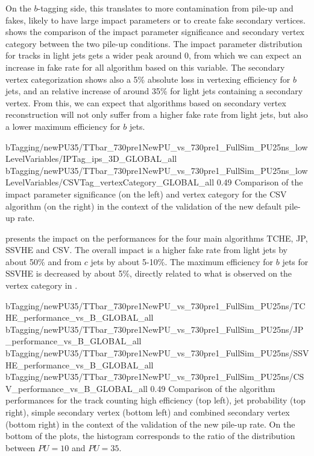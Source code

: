     On the $b$-tagging side, this translates to more contamination from pile-up and
    fakes, likely to have large impact parameters or to create fake secondary vertices.
     shows the comparison of the impact
    parameter significance and secondary vertex category between the two pile-up conditions.
    The impact parameter distribution for tracks in light jets gets a wider peak around
    0, from which we can expect an increase in fake rate for all algorithm based on
    this variable. The secondary vertex categorization shows also a 5\% absolute loss
    in vertexing efficiency for $b$ jets, and an relative increase of around 35\% for light
    jets containing a secondary vertex. From this, we can expect that algorithms based
    on secondary vertex reconstruction will not only suffer from a higher fake rate from
    light jets, but also a lower maximum efficiency for $b$ jets.

                     {bTagging/newPU35/TTbar_730pre1NewPU_vs_730pre1_FullSim_PU25ns_lowLevelVariables/IPTag_ips_3D_GLOBAL_all}
                     {bTagging/newPU35/TTbar_730pre1NewPU_vs_730pre1_FullSim_PU25ns_lowLevelVariables/CSVTag_vertexCategory_GLOBAL_all}
                     {0.49}
                     {Comparison of the impact parameter significance (on the left)
                     and vertex category for the CSV algorithm (on the right) in the
                     context of the validation of the new default pile-up rate.}

     presents the impact on the performances
    for the four main algorithms TCHE, JP, SSVHE and CSV. The overall impact is a higher
    fake rate from light jets by about 50\% and from $c$ jets by about 5-10\%. The
    maximum efficiency for $b$ jets for SSVHE is decreased by about 5\%, directly
    related to what is observed on the vertex category in .

                      {bTagging/newPU35/TTbar_730pre1NewPU_vs_730pre1_FullSim_PU25ns/TCHE_performance_vs_B_GLOBAL_all}
                      {bTagging/newPU35/TTbar_730pre1NewPU_vs_730pre1_FullSim_PU25ns/JP_performance_vs_B_GLOBAL_all}
                      {bTagging/newPU35/TTbar_730pre1NewPU_vs_730pre1_FullSim_PU25ns/SSVHE_performance_vs_B_GLOBAL_all}
                      {bTagging/newPU35/TTbar_730pre1NewPU_vs_730pre1_FullSim_PU25ns/CSV_performance_vs_B_GLOBAL_all}
                      {0.49}
                      {Comparison of the algorithm performances for the track counting high
                      efficiency (top left), jet probability (top right), simple
                      secondary vertex (bottom left) and combined secondary vertex
                      (bottom right) in the context of the validation of the new pile-up
                      rate. On the bottom of the plots, the histogram corresponds
                      to the ratio of the distribution between $PU = 10$ and $PU = 35$.}

